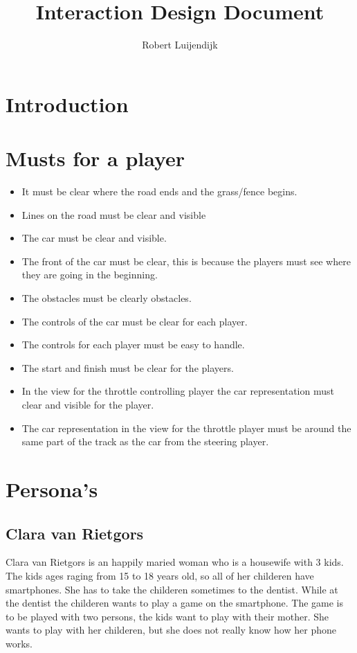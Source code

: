 \documentclass{article}
\title{Interaction Design Document}
\author{Robert Luijendijk}
\date{}
\begin{document}
\maketitle

\section{Introduction}

\section{Musts for a player}
\begin{itemize}
\item It must be clear where the road ends and the grass/fence begins.
\item Lines on the road must be clear and visible
\item The car must be clear and visible.
\item The front of the car must be clear, this is because the players must see where they are going in the beginning.
\item The obstacles must be clearly obstacles.
\item The controls of the car must be clear for each player.
\item The controls for each player must be easy to handle.
\item The start and finish must be clear for the players.
\item In the view for the throttle controlling player the car representation must clear and visible for the player.
\item The car representation in the view for the throttle player must be around the same part of the track as the car from the steering player.
\end{itemize}

\section{Persona's}
\subsection{Clara van Rietgors}
Clara van Rietgors is an happily maried woman who is a housewife with 3 kids. The kids ages raging from 15 to 18 years old, so all of her childeren have smartphones. She has to take the childeren sometimes to the dentist. While at the dentist the childeren wants to play a game on the smartphone. The game is to be played with two persons, the kids want to play with their mother. She wants to play with her childeren, but she does not really know how her phone works. 
\end{document}
